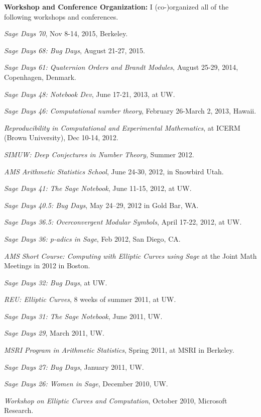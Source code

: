 \documentclass[10pt]{article}
\newenvironment{bulletlist}
   {
      \begin{list}
         {$\cdot$}
         {
            \setlength{\itemsep}{.5ex}
            \setlength{\parsep}{0ex}
            \setlength{\leftmargin}{2.2em}
            \setlength{\parskip}{0ex}
            \setlength{\topsep}{0ex}
         }
   }
   {
      \end{list}
   }
\newcounter{totalnumworkshops}
\newenvironment{workshops}
   {
   \begin{revnumerate}[\value{totalnumworkshops}]
   {}
         {
            \setlength{\itemsep}{.5ex}
            \setlength{\parsep}{0ex}
            \setlength{\leftmargin}{0em}
            \setlength{\parskip}{0ex}
            \setlength{\topsep}{0ex}
         }
   }
   {
\end{revnumerate}
   }
\newcommand{\marginlabel}[1]{
\begin{minipage}[b]{0.8\labelwidth}{\large \textsf{\textbf{#1}}}\end{minipage}}
\newcommand{\entrylabel}[1]{\mbox{\marginlabel{#1}}\hfill}
\newcommand{\MainListlabel}[1]
   {
      \parbox[t]{\labelwidth}{\hspace{.8em}\marginlabel{#1}}
   }
\newenvironment{MainList}[1]
   {
      \renewcommand{\entrylabel}{\MainListlabel}
      \begin{list}{}
      {
         \renewcommand{\makelabel}{\entrylabel}
         \setlength   {\itemindent}{-.65em}
         \setlength   {\labelwidth}{#1}
         \setlength   {\leftmargin}{\labelwidth}
         \setlength   {\itemsep}{3ex}
      }
   }
   {
      \end{list}
   }
\begin{document}
\begin{MainList}{88pt}
\item [Other\\Activities]
{\bf Workshop and Conference Organization:}  I (co-)organized
all of the following workshops and conferences.
\begin{workshops}
\item {\em Sage Days 70}, Nov 8-14, 2015, Berkeley.
\item {\em Sage Days 68: Bug Days}, August 21-27, 2015.
\item {\em Sage Days 61: Quaternion Orders and Brandt Modules}, August 25-29, 2014, Copenhagen, Denmark.
\item {\em Sage Days 48: Notebook Dev}, June 17-21, 2013, at UW.
\item {\em Sage Days 46: Computational number theory}, February 26-March 2, 2013, Hawaii.
\item {\em Reproducibility in Computational and Experimental Mathematics}, at ICERM (Brown University), Dec 10-14, 2012.
\item {\em SIMUW: Deep Conjectures in Number Theory}, Summer 2012.
\item {\em AMS Arithmetic Statistics School}, June 24-30, 2012, in Snowbird Utah.
\item {\em Sage Days 41: The Sage Notebook}, June 11-15, 2012, at UW.
\item {\em Sage Days 40.5: Bug Days}, May 24--29, 2012 in Gold Bar, WA.
\item {\em Sage Days 36.5: Overconvergent Modular Symbols}, April 17-22, 2012, at UW.
\item {\em Sage Days 36: p-adics in Sage}, Feb 2012, San Diego, CA.
\item {\em AMS Short Course: Computing with Elliptic Curves using Sage} at the Joint Math Meetings in 2012 in Boston.
\item {\em Sage Days 32: Bug Days}, at UW.
\item {\em REU: Elliptic Curves}, 8 weeks of summer 2011, at UW.
\item {\em Sage Days 31: The Sage Notebook}, June 2011, UW.
\item {\em Sage Days 29}, March 2011, UW.
\item {\em MSRI Program in Arithmetic Statistics}, Spring 2011, at MSRI in Berkeley.
\item {\em Sage Days 27: Bug Days}, January 2011, UW.
\item {\em Sage Days 26: Women in Sage}, December 2010, UW.
\item {\em Workshop on Elliptic Curves and Computation}, October 2010, Microsoft Research.

\end{workshops}
\end{MainList}
\end{document}

